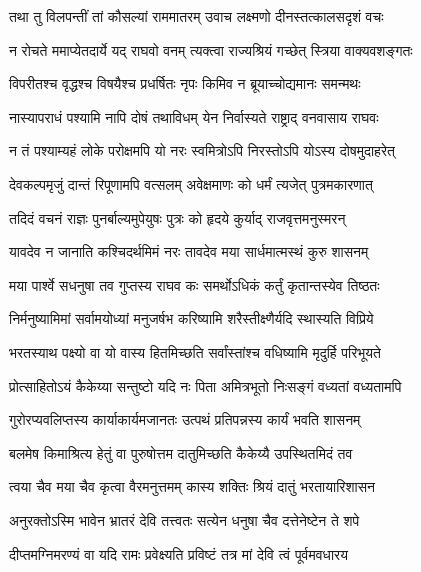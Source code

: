 
\twolineshloka
{तथा तु विलपन्तीं तां कौसल्यां राममातरम्}
{उवाच लक्ष्मणो दीनस्तत्कालसदृशं वचः} %

\twolineshloka
{न रोचते ममाप्येतदार्ये यद् राघवो वनम्}
{त्यक्त्वा राज्यश्रियं गच्छेत् स्त्रिया वाक्यवशङ्गतः} %

\twolineshloka
{विपरीतश्च वृद्धश्च विषयैश्च प्रधर्षितः}
{नृपः किमिव न ब्रूयाच्चोद्यमानः समन्मथः} %

\twolineshloka
{नास्यापराधं पश्यामि नापि दोषं तथाविधम्}
{येन निर्वास्यते राष्ट्राद् वनवासाय राघवः} %

\twolineshloka
{न तं पश्याम्यहं लोके परोक्षमपि यो नरः}
{स्वमित्रोऽपि निरस्तोऽपि योऽस्य दोषमुदाहरेत्} %

\twolineshloka
{देवकल्पमृजुं दान्तं रिपूणामपि वत्सलम्}
{अवेक्षमाणः को धर्मं त्यजेत् पुत्रमकारणात्} %

\twolineshloka
{तदिदं वचनं राज्ञः पुनर्बाल्यमुपेयुषः}
{पुत्रः को हृदये कुर्याद् राजवृत्तमनुस्मरन्} %

\twolineshloka
{यावदेव न जानाति कश्चिदर्थमिमं नरः}
{तावदेव मया सार्धमात्मस्थं कुरु शासनम्} %

\twolineshloka
{मया पार्श्वे सधनुषा तव गुप्तस्य राघव}
{कः समर्थोऽधिकं कर्तुं कृतान्तस्येव तिष्ठतः} %

\twolineshloka
{निर्मनुष्यामिमां सर्वामयोध्यां मनुजर्षभ}
{करिष्यामि शरैस्तीक्ष्णैर्यदि स्थास्यति विप्रिये} %

\twolineshloka
{भरतस्याथ पक्ष्यो वा यो वास्य हितमिच्छति}
{सर्वांस्तांश्च वधिष्यामि मृदुर्हि परिभूयते} %

\twolineshloka
{प्रोत्साहितोऽयं कैकेय्या सन्तुष्टो यदि नः पिता}
{अमित्रभूतो निःसङ्गं वध्यतां वध्यतामपि} %

\twolineshloka
{गुरोरप्यवलिप्तस्य कार्याकार्यमजानतः}
{उत्पथं प्रतिपन्नस्य कार्यं भवति शासनम्} %

\twolineshloka
{बलमेष किमाश्रित्य हेतुं वा पुरुषोत्तम}
{दातुमिच्छति कैकेय्यै उपस्थितमिदं तव} %

\twolineshloka
{त्वया चैव मया चैव कृत्वा वैरमनुत्तमम्}
{कास्य शक्तिः श्रियं दातुं भरतायारिशासन} %

\twolineshloka
{अनुरक्तोऽस्मि भावेन भ्रातरं देवि तत्त्वतः}
{सत्येन धनुषा चैव दत्तेनेष्टेन ते शपे} %

\twolineshloka
{दीप्तमग्निमरण्यं वा यदि रामः प्रवेक्ष्यति}
{प्रविष्टं तत्र मां देवि त्वं पूर्वमवधारय} %

